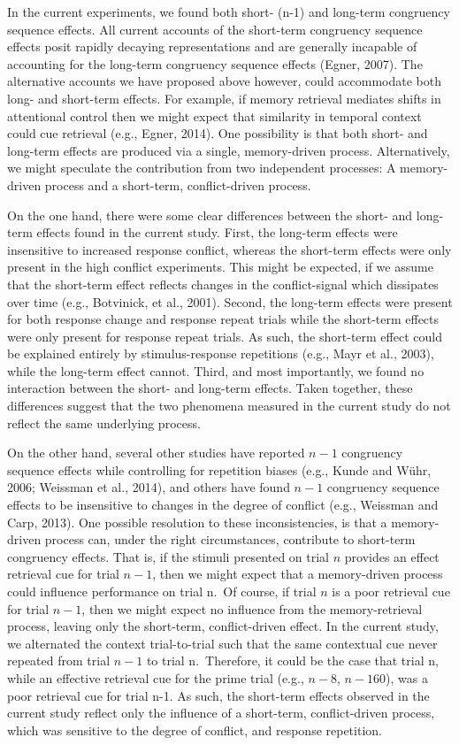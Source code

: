 \documentclass[]{DissertateCUNY}
\begin{document}
In the current experiments, we found both short- (n-1) and long-term
congruency sequence effects. All current accounts of the short-term
congruency sequence effects posit rapidly decaying representations and
are generally incapable of accounting for the long-term congruency
sequence effects (Egner, 2007). The alternative accounts we have
proposed above however, could accommodate both long- and short-term
effects. For example, if memory retrieval mediates shifts in attentional
control then we might expect that similarity in temporal context could
cue retrieval (e.g., Egner, 2014). One possibility is that both short-
and long-term effects are produced via a single, memory-driven process.
Alternatively, we might speculate the contribution from two independent
processes: A memory-driven process and a short-term, conflict-driven
process.

On the one hand, there were some clear differences between the short-
and long-term effects found in the current study. First, the long-term
effects were insensitive to increased response conflict, whereas the
short-term effects were only present in the high conflict experiments.
This might be expected, if we assume that the short-term effect reflects
changes in the conflict-signal which dissipates over time (e.g.,
Botvinick, et al., 2001). Second, the long-term effects were present for
both response change and response repeat trials while the short-term
effects were only present for response repeat trials. As such, the
short-term effect could be explained entirely by stimulus-response
repetitions (e.g., Mayr et al., 2003), while the long-term effect
cannot. Third, and most importantly, we found no interaction between the
short- and long-term effects. Taken together, these differences suggest
that the two phenomena measured in the current study do not reflect the
same underlying process.

On the other hand, several other studies have reported \(n-1\)
congruency sequence effects while controlling for repetition biases
(e.g., Kunde and Wühr, 2006; Weissman et al., 2014), and others have
found \(n-1\) congruency sequence effects to be insensitive to changes
in the degree of conflict (e.g., Weissman and Carp, 2013). One possible
resolution to these inconsistencies, is that a memory-driven process
can, under the right circumstances, contribute to short-term congruency
effects. That is, if the stimuli presented on trial \(n\) provides an
effect retrieval cue for trial \(n-1\), then we might expect that a
memory-driven process could influence performance on trial n.~Of course,
if trial \(n\) is a poor retrieval cue for trial \(n-1\), then we might
expect no influence from the memory-retrieval process, leaving only the
short-term, conflict-driven effect. In the current study, we alternated
the context trial-to-trial such that the same contextual cue never
repeated from trial \(n-1\) to trial n.~Therefore, it could be the case
that trial n, while an effective retrieval cue for the prime trial
(e.g., \(n-8\), \(n-160\)), was a poor retrieval cue for trial n-1. As
such, the short-term effects observed in the current study reflect only
the influence of a short-term, conflict-driven process, which was
sensitive to the degree of conflict, and response repetition.
\end{document}
